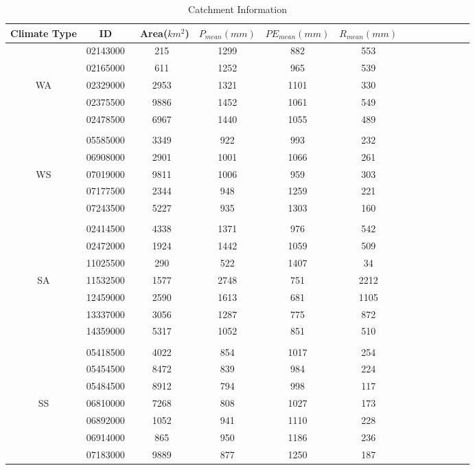 \documentclass[11pt]{article}
\begin{document}
\begin{table}[H] \scriptsize
\caption{Catchment Information} 
\resizebox{\textwidth}{!}
{
\begin{tabular}{ccccccccccccc}
\toprule
Climate Type& ID &\ Area($km^2$)& $P_{mean}(mm)$& $PE_{mean}(mm)$&  $R_{mean}(mm)$  \\
\midrule
 
& 02143000 & 215    & 1299  &  882 &   553\\
&  02165000 & 611   & 1252  &  965  &  539\\
WA&02329000&  2953    & 1321 &  1101   &   330\\   
&02375500 &  9886   & 1452  &  1061   & 549\\
&02478500  &  6967  & 1440  &  1055  &  489\\
\\
&05585000  &  3349      & 922      &    993     &  232    \\
&06908000  &  2901      & 1001     &    1066    &  261   \\
WS&07019000  &  9811      & 1006     &    959     &  303    \\
&07177500  &  2344      & 948      &    1259     &  221    \\
&07243500 & 5227  & 935  &  1303  &  160\\
\\
&02414500& 4338  & 1371 & 976 & 542  \\
&02472000&  1924 & 1442 &1059  &  509 \\
& 11025500&    290  &  522  & 1407   & 34  \\
SA&11532500 & 1577   & 2748 &  751  &  2212\\
&12459000&  2590 & 1613 & 681 & 1105  \\
&13337000& 3056  & 1287 & 775 &  872 \\
&14359000&  5317 & 1052 & 851 &  510 \\
\\
&05418500&4022   &854  &1017 & 254  \\
&05454500& 8472  &839  & 984 & 224  \\
&05484500& 8912  & 794 & 998 &  117 \\
SS&06810000& 7268  & 808 &1027  &173   \\
&06892000& 1052  & 941 &1110 & 228  \\
&06914000& 865  & 950 & 1186 & 236  \\
&07183000& 9889  & 877 & 1250 & 187  \\
\bottomrule
\end{tabular}
}
\end{table}
\end{document}
